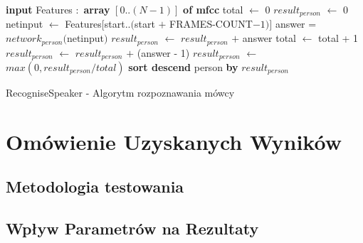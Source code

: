 \documentclass[a4paper]{article}
\begin{document}
		\begin{algorithm}
			\begin{algorithmic}[1]
				\STATE \textbf{input} Features $:$ \textbf{array} $[0 .. (N-1)]$ \textbf{of mfcc}
				\STATE				
				\STATE total $\leftarrow$ 0
					\STATE $result_{person}$ $\leftarrow$ 0
				\ENDFOR
				\STATE
					\STATE {}
					\STATE {}
					\STATE netinput $\leftarrow$ Features$[$start$ .. ($start $+$ FRAMES-COUNT$-1)]$
					\STATE
						\STATE answer = $network_{person}($netinput$)$
								\STATE $result_{person}$ $\leftarrow$ $result_{person}$ $+$ answer
								\STATE total $\leftarrow$ total + 1
							\ELSE
								\STATE $result_{person}$ $\leftarrow$ $result_{person}$ $+$ (answer - 1)
							\ENDIF
							\STATE {}
						\ENDIF	
					\ENDFOR
				\ENDFOR
				\STATE
					\STATE $result_{person}$ $\leftarrow$ $max(0, result_{person} / total)$
				\ENDFOR
				\STATE \textbf{sort descend} person \textbf{by} $result_{person}$
			\end{algorithmic}			
			\caption{RecogniseSpeaker - Algorytm rozpoznawania mówcy}
			\label{alg:recognise}
		\end{algorithm}
		\clearpage
	
\section{Omówienie Uzyskanych Wyników}
	\subsection{Metodologia testowania}
	\subsection{Wpływ Parametrów na Rezultaty}
\end{document}
